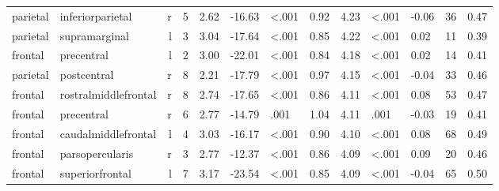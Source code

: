 \documentclass{article}
\begin{document}
\begin{longtable}{llrR{1.3cm}R{1cm}R{1.3cm}R{1cm}R{1cm}R{1.3cm}R{1cm}R{1.8cm}R{1.3cm}R{1.8cm}}
  parietal &          inferiorparietal &    r &         5 &                  2.62 &           -16.63 &      \textless.001 &                               0.92 &                          4.23 &                   \textless.001 &  -0.06 &     36 &      0.47 \\
  parietal &             supramarginal &    l &         3 &                  3.04 &           -17.64 &      \textless.001 &                               0.85 &                          4.22 &                   \textless.001 &   0.02 &     11 &      0.39 \\
   frontal &                precentral &    l &         2 &                  3.00 &           -22.01 &      \textless.001 &                               0.84 &                          4.18 &                   \textless.001 &   0.02 &     14 &      0.41 \\
  parietal &               postcentral &    r &         8 &                  2.21 &           -17.79 &      \textless.001 &                               0.97 &                          4.15 &                   \textless.001 &  -0.04 &     33 &      0.46 \\
   frontal &      rostralmiddlefrontal &    r &         8 &                  2.74 &           -17.65 &      \textless.001 &                               0.86 &                          4.11 &                   \textless.001 &   0.08 &     53 &      0.47 \\
   frontal &                precentral &    r &         6 &                  2.77 &           -14.79 &               .001 &                               1.04 &                          4.11 &                            .001 &  -0.03 &     19 &      0.41 \\
   frontal &       caudalmiddlefrontal &    l &         4 &                  3.03 &           -16.17 &      \textless.001 &                               0.90 &                          4.10 &                   \textless.001 &   0.08 &     68 &      0.49 \\
   frontal &           parsopercularis &    r &         3 &                  2.77 &           -12.37 &      \textless.001 &                               0.86 &                          4.09 &                   \textless.001 &   0.09 &     20 &      0.46 \\
   frontal &           superiorfrontal &    l &         7 &                  3.17 &           -23.54 &      \textless.001 &                               0.85 &                          4.09 &                   \textless.001 &  -0.04 &     65 &      0.50 \\

\end{longtable}
\end{document}
